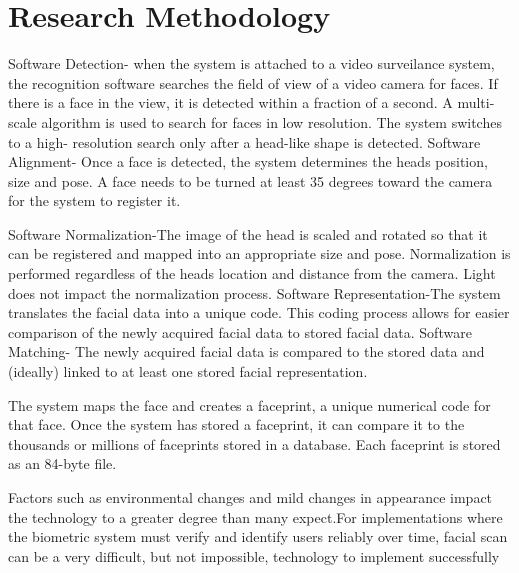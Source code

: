 \documentclass[a4paper,12pt]{article}
\begin{document}
\section{Research Methodology}
\hspace{1cm} Software Detection- when the system is attached to a video surveilance system, the recognition software searches the field of view of a video camera for faces. If there is a face in the view, it is detected within a fraction of a second. A multi-scale algorithm is used to search for faces in low resolution. The system switches to a high- resolution search only after a head-like shape is detected. Software Alignment- Once a face is detected, the system determines the heads position, size and pose. A face needs to be turned at least 35 degrees toward the camera for the system to register it. 

\hspace{1cm}Software Normalization-The image of the head is scaled and rotated so that it can be registered and mapped into an appropriate size and pose. Normalization is performed regardless of the heads location and distance from the camera. Light does not impact the normalization process. Software Representation-The system translates the facial data into a unique code. This coding process allows for easier comparison of the newly acquired facial data to stored facial data. Software Matching- The newly acquired facial data is compared to the stored data and (ideally) linked to at least one stored facial representation.

\hspace{1cm}The system maps the face and creates a faceprint, a unique numerical code for that face. Once the system has stored a faceprint, it can compare it to the thousands or millions of faceprints stored in a database. Each faceprint is stored as an 84-byte file.

\hspace{1cm} Factors such as environmental changes and mild changes in appearance impact the technology to a greater degree than many expect.For implementations where the biometric system must verify and identify users reliably over time, facial scan can be a very difficult, but not impossible, technology to implement successfully

\newpage
\end{document}
